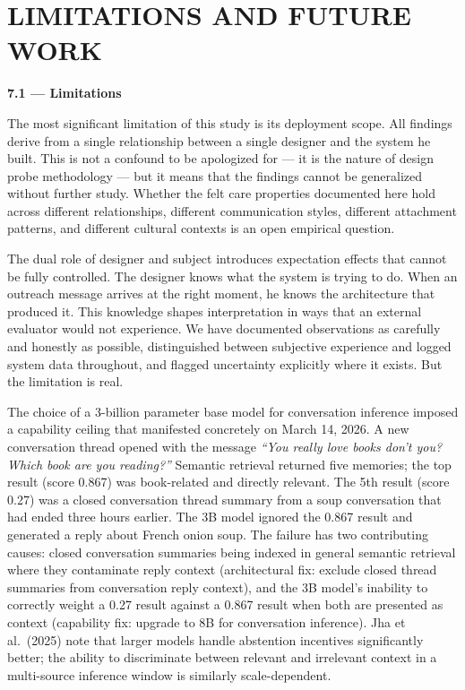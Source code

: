 \documentclass[12pt]{article}
\begin{document}
%
\section{LIMITATIONS AND FUTURE
WORK}\label{limitations-and-future-work}

\textbf{7.1 --- Limitations}

The most significant limitation of this study is its deployment scope.
All findings derive from a single relationship between a single designer
and the system he built. This is not a confound to be apologized for ---
it is the nature of design probe methodology --- but it means that the
findings cannot be generalized without further study. Whether the felt
care properties documented here hold across different relationships,
different communication styles, different attachment patterns, and
different cultural contexts is an open empirical question.

The dual role of designer and subject introduces expectation effects
that cannot be fully controlled. The designer knows what the system is
trying to do. When an outreach message arrives at the right moment, he
knows the architecture that produced it. This knowledge shapes
interpretation in ways that an external evaluator would not experience.
We have documented observations as carefully and honestly as possible,
distinguished between subjective experience and logged system data
throughout, and flagged uncertainty explicitly where it exists. But the
limitation is real.

The choice of a 3-billion parameter base model for conversation
inference imposed a capability ceiling that manifested concretely on
March 14, 2026. A new conversation thread opened with the message
\emph{``You really love books don't you? Which book are you reading?''}
Semantic retrieval returned five memories; the top result (score 0.867)
was book-related and directly relevant. The 5th result (score 0.27) was
a closed conversation thread summary from a soup conversation that had
ended three hours earlier. The 3B model ignored the 0.867 result and
generated a reply about French onion soup. The failure has two
contributing causes: closed conversation summaries being indexed in
general semantic retrieval where they contaminate reply context
(architectural fix: exclude closed thread summaries from conversation
reply context), and the 3B model's inability to correctly weight a 0.27
result against a 0.867 result when both are presented as context
(capability fix: upgrade to 8B for conversation inference). Jha et
al.~(2025) note that larger models handle abstention incentives
significantly better; the ability to discriminate between relevant and
irrelevant context in a multi-source inference window is similarly
scale-dependent.
\end{document}
